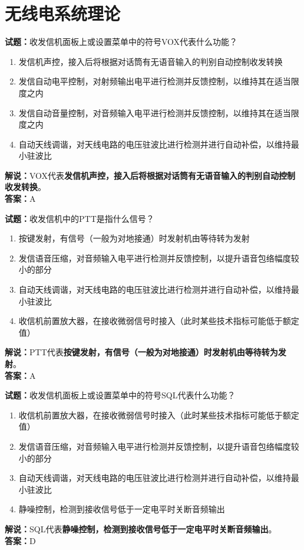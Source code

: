 \documentclass{ctexbook}
\begin{document}

\chapter{无线电系统理论}




\noindent\textbf{试题：}收发信机面板上或设置菜单中的符号VOX代表什么功能？
\begin{enumerate}[leftmargin=3em]
\item 发信机声控，接入后将根据对话筒有无语音输入的判别自动控制收发转换
\item 发信自动电平控制，对射频输出电平进行检测并反馈控制，以维持其在适当限度之内
\item 发信自动音量控制，对音频输入电平进行检测并反馈控制，以维持其在适当限度之内
\item 自动天线调谐，对天线电路的电压驻波比进行检测并进行自动补偿，以维持最小驻波比
\end{enumerate}
\noindent\textbf{解说：}VOX代表\textbf{发信机声控，接入后将根据对话筒有无语音输入的判别自动控制收发转换}。\\\noindent\textbf{答案：}A



\bigskip


\noindent\textbf{试题：}收发信机中的PTT是指什么信号？
\begin{enumerate}[leftmargin=3em]
\item 按键发射，有信号（一般为对地接通）时发射机由等待转为发射
\item 发信语音压缩，对音频输入电平进行检测并反馈控制，以提升语音包络幅度较小的部分
\item 自动天线调谐，对天线电路的电压驻波比进行检测并进行自动补偿，以维持最小驻波比
\item 收信机前置放大器，在接收微弱信号时接入（此时某些技术指标可能低于额定值）
\end{enumerate}
\noindent\textbf{解说：}PTT代表\textbf{按键发射，有信号（一般为对地接通）时发射机由等待转为发射}。\\\noindent\textbf{答案：}A



\bigskip


\noindent\textbf{试题：}收发信机面板上或设置菜单中的符号SQL代表什么功能？
\begin{enumerate}[leftmargin=3em]
\item 收信机前置放大器，在接收微弱信号时接入（此时某些技术指标可能低于额定值）
\item 发信语音压缩，对音频输入电平进行检测并反馈控制，以提升语音包络幅度较小的部分
\item 自动天线调谐，对天线电路的电压驻波比进行检测并进行自动补偿，以维持最小驻波比
\item 静噪控制，检测到接收信号低于一定电平时关断音频输出
\end{enumerate}
\noindent\textbf{解说：}SQL代表\textbf{静噪控制，检测到接收信号低于一定电平时关断音频输出}。\\\noindent\textbf{答案：}D
\end{document}
